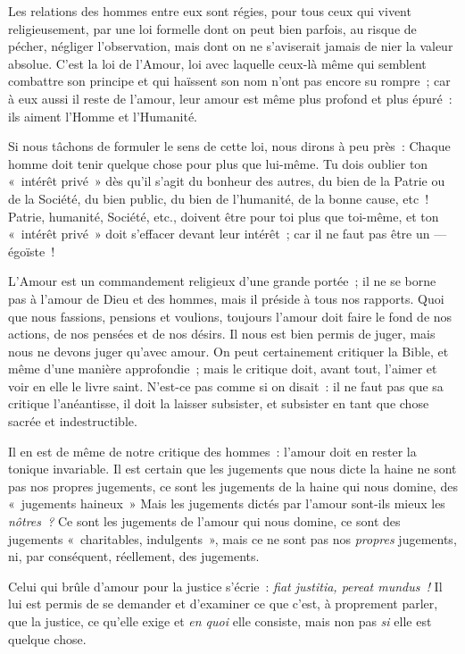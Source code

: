 \documentclass[french,twoside]{book} %
\begin{document}
\noindent Les relations des hommes entre eux sont régies, pour tous ceux qui vivent religieusement, par une loi formelle dont on peut bien parfois, au risque de pécher, négliger l’observation, mais dont on ne s’aviserait jamais de nier la valeur absolue. C’est la loi de l’Amour, loi avec laquelle ceux-là même qui semblent combattre son principe et qui haïssent son nom n’ont pas encore su rompre ; car à eux aussi il reste de l’amour, leur amour est même plus profond et plus épuré : ils aiment l’Homme et l’Humanité.\par
Si nous tâchons de formuler le sens de cette loi, nous dirons à peu près : Chaque homme doit tenir quelque chose pour plus que lui-même. Tu dois oublier ton « intérêt privé » dès qu’il s’agit du bonheur des autres, du bien de la Patrie ou de la Société, du bien public, du bien de l’humanité, de la bonne cause, etc ! Patrie, humanité, Société, etc., doivent être pour toi plus que toi-même, et ton « intérêt privé » doit s’effacer devant leur intérêt ; car il ne faut pas être un — égoïste !\par
L’Amour est un commandement religieux d’une grande portée ; il ne se borne pas à l’amour de Dieu et des hommes, mais il préside à tous nos rapports. Quoi que nous fassions, pensions et voulions, toujours l’amour doit faire le fond de nos actions, de nos pensées et de nos désirs. Il nous est bien permis de juger, mais nous ne devons juger qu’avec amour. On peut certainement critiquer la Bible, et même  d’une manière approfondie ; mais le critique doit, avant tout, l’aimer et voir en elle le livre saint. N’est-ce pas comme si on disait : il ne faut pas que sa critique l’anéantisse, il doit la laisser subsister, et subsister en tant que chose sacrée et indestructible.\par
Il en est de même de notre critique des hommes : l’amour doit en rester la tonique invariable. Il est certain que les jugements que nous dicte la haine ne sont pas nos propres jugements, ce sont les jugements de la haine qui nous domine, des « jugements haineux » Mais les jugements dictés par l’amour sont-ils mieux les \emph{nôtres ?} Ce sont les jugements de l’amour qui nous domine, ce sont des jugements « charitables, indulgents », mais ce ne sont pas nos \emph{propres} jugements, ni, par conséquent, réellement, des jugements.\par
Celui qui brûle d’amour pour la justice s’écrie : \emph{fiat justitia, pereat mundus !} Il lui est permis de se demander et d’examiner ce que c’est, à proprement parler, que la justice, ce qu’elle exige et \emph{en quoi} elle consiste, mais non pas \emph{si} elle est quelque chose.\par
\end{document}
